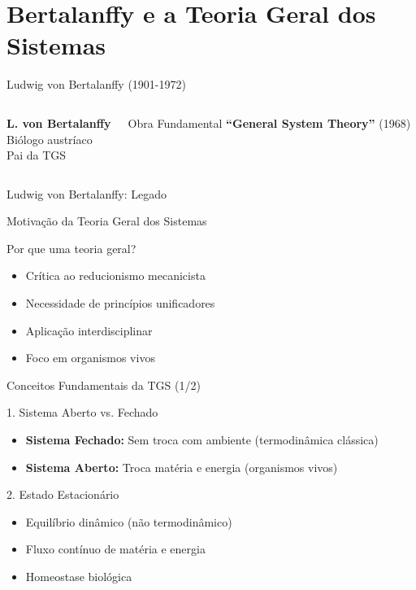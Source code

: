 \section{Bertalanffy e a Teoria Geral dos Sistemas}

\begin{frame}{Ludwig von Bertalanffy (1901-1972)}
\begin{columns}
\begin{center}
\textbf{L. von Bertalanffy}\\
\vspace{0.2cm}
{\small Biólogo austríaco}\\
{\small Pai da TGS}
\end{center}

\begin{block}{Obra Fundamental}
\textbf{``General System Theory''} (1968)
\end{block}
\end{columns}
\end{frame}

\begin{frame}{Ludwig von Bertalanffy: Legado}
\end{frame}

\begin{frame}{Motivação da Teoria Geral dos Sistemas}
\begin{block}{Por que uma teoria geral?}
\begin{itemize}
    \item Crítica ao reducionismo mecanicista
    \item Necessidade de princípios unificadores
    \item Aplicação interdisciplinar
    \item Foco em organismos vivos
\end{itemize}
\end{block}
\end{frame}

\begin{frame}{Conceitos Fundamentais da TGS (1/2)}
\begin{block}{1. Sistema Aberto vs. Fechado}
\begin{itemize}
    \item \textbf{Sistema Fechado:} Sem troca com ambiente (termodinâmica clássica)
    \item \textbf{Sistema Aberto:} Troca matéria e energia (organismos vivos)
\end{itemize}
\end{block}

\begin{block}{2. Estado Estacionário}
\begin{itemize}
    \item Equilíbrio dinâmico (não termodinâmico)
    \item Fluxo contínuo de matéria e energia
    \item Homeostase biológica
\end{itemize}
\end{block}
\end{frame}

